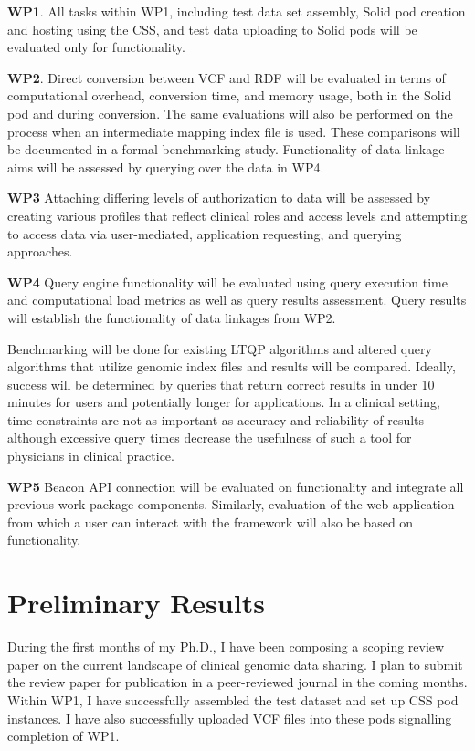 \documentclass[runningheads]{llncs}
\begin{document}
\textbf{WP1}.
All tasks within WP1, including test data set assembly, Solid pod creation and hosting using the CSS, and test data uploading to Solid pods will be evaluated only for functionality.

\textbf{WP2}.
Direct conversion between VCF and RDF will be evaluated in terms of computational overhead, conversion time, and memory usage, both in the Solid pod and during conversion.
The same evaluations will also be performed on the process when an intermediate mapping index file is used. 
These comparisons will be documented in a formal benchmarking study.
Functionality of data linkage aims will be assessed by querying over the data in WP4.

\textbf{WP3}
Attaching differing levels of authorization to data will be assessed by creating various profiles that reflect clinical roles and access levels and attempting to access data via user-mediated, application requesting, and querying approaches. 

\textbf{WP4}
Query engine functionality will be evaluated using query execution time and computational load metrics as well as query results assessment. 
Query results will establish the functionality of data linkages from WP2.

Benchmarking will be done for existing LTQP algorithms and altered query algorithms that utilize genomic index files and results will be compared.
Ideally, success will be determined by queries that return correct results in under 10 minutes for users and potentially longer for applications.
In a clinical setting, time constraints are not as important as accuracy and reliability of results although excessive query times decrease the usefulness of such a tool for physicians in clinical practice.

\textbf{WP5}
Beacon API connection will be evaluated on functionality and integrate all previous work package components. 
Similarly, evaluation of the web application from which a user can interact with the framework will also be based on functionality.


\section{Preliminary Results}

During the first months of my Ph.D., I have been composing a scoping review paper on the current landscape of clinical genomic data sharing.
I plan to submit the review paper for publication in a peer-reviewed journal in the coming months.
Within WP1, I have successfully assembled the test dataset and set up CSS pod instances.
I have also successfully uploaded VCF files into these pods signalling completion of WP1. 
\end{document}
